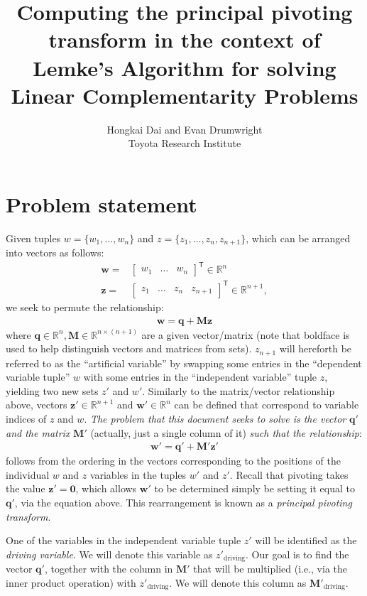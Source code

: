 \documentclass{article}
\title{Computing the principal pivoting transform in the context of Lemke's
Algorithm for solving Linear Complementarity Problems}
\date{}
\author{Hongkai Dai and Evan Drumwright\\Toyota Research Institute}
\providecommand{\tr}[1]{{#1}^{\ensuremath{\mathsf{T}}}} %
\providecommand{\vect}[1]{\bm#1}
\providecommand{\mat}[1]{\mathbf#1}
\newcommand{\1}{(\textos{1})\!}
\newcommand{\2}{(\textos{2})\!}
\newcommand{\3}{(\textos{3})\!}
\newcommand{\4}{(\textos{4})\!}
\newcommand{\5}{(\textos{5})\!}
\newcommand{\6}{(\textos{6})\!}
\newcommand{\7}{(\textos{7})\!}
\newcommand{\8}{(\textos{8})\!}
\begin{document}
\maketitle
\section{Problem statement} Given tuples $w = \{ w_1, \hdots, w_n \}$ and $z = \{z_1, \hdots, z_n, z_{n+1}\}$, which can be arranged into vectors as follows:
\begin{align*}
	\vect{w} =& \tr{\begin{bmatrix}w_1 & \hdots & w_n \end{bmatrix}}\in\mathbb{R}^n \\
		\vect{z} =& \tr{\begin{bmatrix}z_1 & \hdots & z_n & z_{n+1} \end{bmatrix}}\in\mathbb{R}^{n+1},
\end{align*}
we seek to permute the relationship:
\begin{align*}
	\vect{w} = \vect{q} + \mat{M}\vect{z}
\end{align*}
where $\vect{q}\in\mathbb{R}^n, \mat{M}\in\mathbb{R}^{n\times (n+1)}$ are a given vector/matrix (note that boldface is used to help distinguish vectors and matrices from sets). $z_{n+1}$ will hereforth be referred to as the ``artificial variable'' by swapping some entries in the ``dependent variable tuple'' $w$ with some entries in the ``independent variable'' tuple $z$, yielding two new sets $z'$ and $w'$. Similarly to the matrix/vector relationship above, vectors $\vect{z}' \in \mathbb{R}^{n+1}$ and $\vect{w}' \in \mathbb{R}^n$ can be defined that correspond to variable indices of $z$ and $w$. \emph{The problem that this document seeks to solve is the vector} $\vect{q}'$ \emph{and the matrix} $\mat{M}'$ (actually, just a single column of it) \emph{such that the relationship}:
\begin{align*}
\vect{w}' = \vect{q}' + \mat{M}'\vect{z}'
\end{align*}
follows from the ordering in the vectors corresponding to the positions of the
individual $w$ and $z$ variables in the tuples $w'$ and $z'$. Recall that
pivoting takes the value $\vect{z'} = \vect{0}$, which allows $\vect{w'}$ to be
determined simply be setting it equal to $\vect{q}'$, via the equation above.
This rearrangement is known as a \emph{principal pivoting transform}. 

One of the variables in the independent variable tuple $z'$ will be identified as the \textit{driving variable}. We will denote this variable as $z'_{\textrm{driving}}$. Our goal is to find the vector $\vect{q}'$, together with the column in $\mat{M}'$ that will be multiplied (i.e., via the inner product operation) with $z'_{\textrm{driving}}$. We will denote this column as $\mat{M}'_{\textrm{driving}}$.
\end{document}

